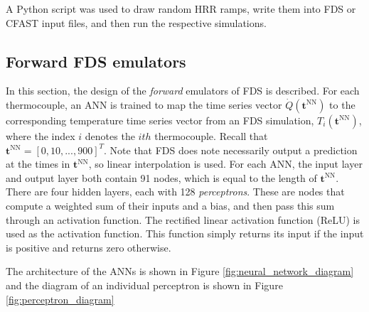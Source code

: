 \documentclass{article}
\begin{document}
A Python script was used to draw random HRR ramps, write them into FDS or CFAST input files, and then run the respective simulations. 

\subsection{Forward FDS emulators}

In this section, the design of the \textit{forward} emulators of FDS is described. For each thermocouple, an ANN is trained to map the time series vector $\dot{Q}(\boldsymbol{t}^\text{NN})$ to the corresponding temperature time series vector from an FDS simulation, $T_i(\boldsymbol{t}^\text{NN})$, where the index $i$ denotes the $ith$ thermocouple. Recall that $\boldsymbol{t}^\text{NN} = [0, 10, ..., 900]^T $. Note that FDS does note necessarily output a prediction at the times in $\boldsymbol{t}^\text{NN}$, so linear interpolation is used. For each ANN, the input layer and output layer both contain 91 nodes, which is equal to the length of $\boldsymbol{t}^\text{NN}$. There are four hidden layers, each with 128 \textit{perceptrons}. These are nodes that compute a weighted sum of their inputs and a bias, and then pass this sum through an activation function. The rectified linear activation function (ReLU) is used as the activation function. This function simply returns its input if the input is positive and returns zero otherwise.

The architecture of the ANNs is shown in Figure \ref{fig:neural_network_diagram} and the diagram of an individual perceptron is shown in Figure \ref{fig:perceptron_diagram}
\end{document}

